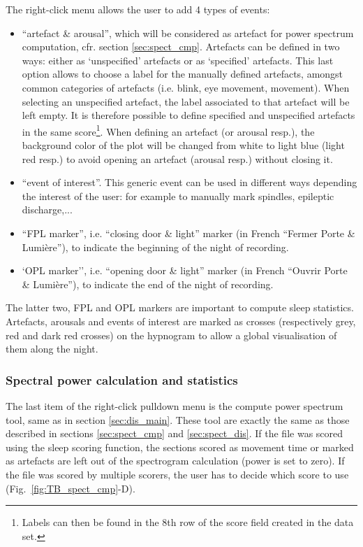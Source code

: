 \documentclass[a4paper,titlepage]{article}
\newcommand{\bi}{\begin{itemize}}
\newcommand{\ei}{\end{itemize}}
\begin{document}
The right-click menu allows the user to add 4 types of events: 
\bi
\item ``artefact \& arousal'', which will be considered as artefact for power spectrum computation, cfr. section \ref{sec:spect_cmp}. Artefacts can be defined in two ways: either as `unspecified' artefacts or as `specified' artefacts. This last option allows to choose a label for the manually defined artefacts, amongst common categories of artefacts (i.e. blink, eye movement, movement). When selecting an unspecified artefact, the label associated to that artefact will be left empty. It is therefore possible to define specified and unspecified artefacts in the same score\footnote{Labels can then be found in the 8th row of the score field created in the data set.}. When defining an artefact (or arousal resp.), the background color of the plot will be changed from white to light blue (light red resp.) to avoid opening an artefact (arousal resp.) without closing it.
\item ``event of interest''. This generic event can be used in different ways depending the interest of the user: for example to manually mark spindles, epileptic discharge,...
\item ``FPL marker'', i.e. ``closing door \& light'' marker (in French ``Fermer Porte \& Lumi\`ere''), to indicate the beginning of the night of recording.
\item `OPL marker'', i.e. ``opening door \& light'' marker (in French ``Ouvrir Porte \& Lumi\`ere''), to indicate the end of the night of recording.
\ei
The latter two, FPL and OPL markers are important to compute sleep statistics.
Artefacts, arousals and events of interest are marked as crosses (respectively grey, red and dark red crosses) on the hypnogram to allow a global visualisation of them along the night.


\subsubsection{Spectral power calculation and statistics}
\label{sec:SleepSpectPwr}
The last item of the right-click pulldown menu is the compute power spectrum tool, same as in section \ref{sec:dis_main}.
These tool are exactly the same as those described in sections \ref{sec:spect_cmp} and \ref{sec:spect_dis}. If the file was scored using the sleep scoring function, the sections scored as movement time or marked as artefacts are left out of the spectrogram calculation (power is set to zero). If the file was scored by multiple scorers, the user has to decide which score to use (Fig.~\ref{fig:TB_spect_cmp}-D).
\end{document}
